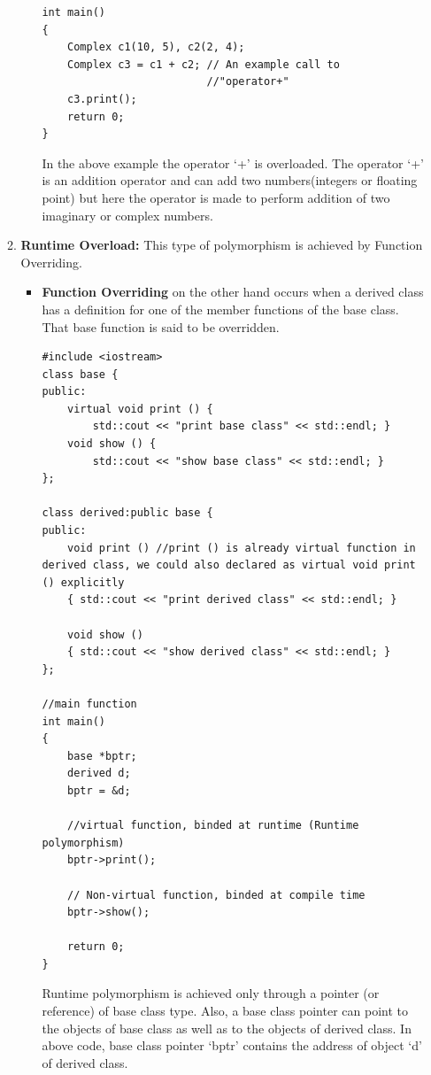 \documentclass[main]{subfiles}
\begin{document}
\begin{itemize}
\begin{enumerate}
\begin{itemize}
\begin{verbatim}
int main() 
{ 
    Complex c1(10, 5), c2(2, 4); 
    Complex c3 = c1 + c2; // An example call to 
                          //"operator+" 
    c3.print(); 
    return 0;
}
            \end{verbatim}
            In the above example the operator ‘+’ is overloaded. The operator ‘+’ is an addition operator and can add two numbers(integers or floating point) but here the operator is made to perform addition of two imaginary or complex numbers.
        \end{itemize}
        \item\textbf{Runtime Overload:} This type of polymorphism is achieved by Function Overriding.
        \begin{itemize}
            \item \textbf{Function Overriding} on the other hand occurs when a derived class has a definition for one of the member functions of the base class. That base function is said to be overridden.
            \begin{verbatim}
#include <iostream> 
class base { 
public: 
    virtual void print () { 
        std::cout << "print base class" << std::endl; } 
    void show () {
        std::cout << "show base class" << std::endl; } 
}; 
   
class derived:public base { 
public: 
    void print () //print () is already virtual function in derived class, we could also declared as virtual void print () explicitly 
    { std::cout << "print derived class" << std::endl; } 
   
    void show () 
    { std::cout << "show derived class" << std::endl; } 
}; 
  
//main function 
int main()  
{ 
    base *bptr; 
    derived d; 
    bptr = &d; 
       
    //virtual function, binded at runtime (Runtime polymorphism) 
    bptr->print();  
       
    // Non-virtual function, binded at compile time 
    bptr->show();  
  
    return 0; 
} 
            \end{verbatim}
            Runtime polymorphism is achieved only through a pointer (or reference) of base class type. Also, a base class pointer can point to the objects of base class as well as to the objects of derived class. In above code, base class pointer ‘bptr’ contains the address of object ‘d’ of derived class.
            

\end{itemize}
\end{enumerate}
\end{itemize}
\end{document}

